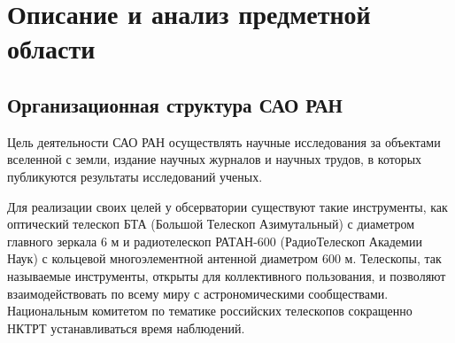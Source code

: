 \section{Описание и анализ предметной области}
\begin{comment}

пример рисунка
\addimghere{photo.jpg}{0.25}{1}{1}
\subsection{пример второго уровня заголовка}
@@ -14,10 +16,87 @@ \subsection{пример второго уровня заголовка}
\end{tabular}
\end{center}
\end{table}
\addimghere{commpa}{1}{Организация структуры на примере диаграммы компонентов}{commpa}
\addimghere{communication}{1}{Диаграмма коммуникации компонентов}{commu}
\addimghere{graph}{0.5}{Граф показывающий связь между объектами и передаваемый объем информации}{graph}
\section{Математическая модель}
бла бла 
\end{comment}

\subsection{Организационная структура САО РАН}
Цель деятельности САО РАН осуществлять научные исследования за объектами вселенной с земли, издание научных журналов и научных трудов, в которых публикуются результаты исследований ученых.

Для реализации своих целей у обсерватории существуют такие инструменты, как оптический телескоп БТА (Большой Телескоп Азимутальный) с диаметром главного зеркала 6 м и радиотелескоп РАТАН-600 (РадиоТелескоп Академии Наук) с кольцевой многоэлементной антенной диаметром 600 м. Телескопы, так называемые инструменты, открыты для коллективного пользования, и позволяют взаимодействовать по всему миру с астрономическими сообществами. Национальным комитетом по тематике российских телескопов сокращенно НКТРТ устанавливаться время наблюдений.

